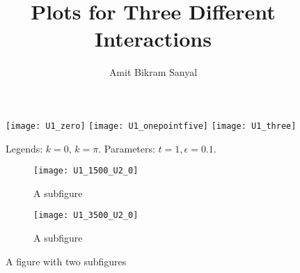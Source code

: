 \documentclass[a4, 11 pt]{article}
\title{Plots for Three Different Interactions}
\author{Amit Bikram Sanyal}
\begin{document}
\begin{figure}[h!]
\centering
\texttt{[image: U1\_zero]}
\texttt{[image: U1\_onepointfive]}
\texttt{[image: U1\_three]}
\caption{
Legends: {\color{blue} $k = 0$}, {\color{red} $k = \pi$}.
Parameters: $t = 1, \epsilon = 0.1$.
	}
\label{fig:u1zero}
\end{figure}

\begin{figure}[h!]
	\centering
	\begin{subfigure}{.5\linewidth}
		\centering
		\texttt{[image: U1\_1500\_U2\_0]}
		\caption{A subfigure}
		\label{fig:sub1}
	\end{subfigure}%
	\begin{subfigure}{.5\linewidth}
		\centering
		\texttt{[image: U1\_3500\_U2\_0]}
		\caption{A subfigure}
		\label{fig:sub2}
	\end{subfigure}
	\caption{A figure with two subfigures}
	\label{fig:test}
\end{figure}
\end{document}
